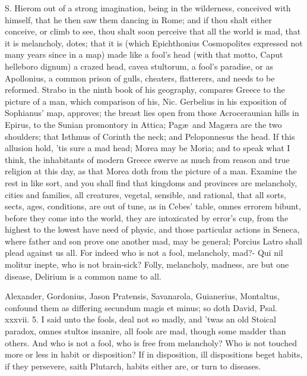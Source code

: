 {S. Hierom out of a strong imagination, being in the wilderness,
conceived with himself, that he then saw them dancing in Rome; and if
thou shalt either conceive, or climb to see, thou shalt soon perceive
that all the world is mad, that it is melancholy, dotes; that it is
(which Epichthonius Cosmopolites expressed not many years since in a
map) made like a fool's head (with that motto, Caput helleboro dignum)
a crazed head, cavea stultorum, a fool's paradise, or as Apollonius, a
common prison of gulls, cheaters, flatterers, \etc and needs to be
reformed. Strabo in the ninth book of his geography, compares Greece to
the picture of a man, which comparison of his, Nic. Gerbelius in his
exposition of Sophianus' map, approves; the breast lies open from those
Acroceraunian hills in Epirus, to the Sunian promontory in Attica;
Pag\ae{}\ and Mag\ae{}ra are the two shoulders; that Isthmus of Corinth the
neck; and Peloponnesus the head. If this allusion hold, 'tis sure a mad
head; Morea may be Moria; and to speak what I think, the inhabitants of
modern Greece swerve as much from reason and true religion at this day,
as that Morea doth from the picture of a man. Examine the rest in like
sort, and you shall find that kingdoms and provinces are melancholy,
cities and families, all creatures, vegetal, sensible, and rational,
that all sorts, sects, ages, conditions, are out of tune, as in Cebes'
table, omnes errorem bibunt, before they come into the world, they are
intoxicated by error's cup, from the highest to the lowest have need of
physic, and those particular actions in Seneca, where father and
son prove one another mad, may be general; Porcius Latro shall plead
against us all. For indeed who is not a fool, melancholy, mad?-
Qui nil molitur inepte, who is not brain-sick? Folly, melancholy,
madness, are but one disease, Delirium is a common name to all.

Alexander, Gordonius, Jason Pratensis, Savanarola, Guianerius,
Montaltus, confound them as differing secundum magis et minus; so doth
David, Psal. xxxvii. 5. I said unto the fools, deal not so madly, and
'twas an old Stoical paradox, omnes stultos insanire, all fools
are mad, though some madder than others. And who is not a fool, who is
free from melancholy? Who is not touched more or less in habit or
disposition? If in disposition, ill dispositions beget habits, if they
persevere, saith Plutarch, habits either are, or turn to diseases.

}
